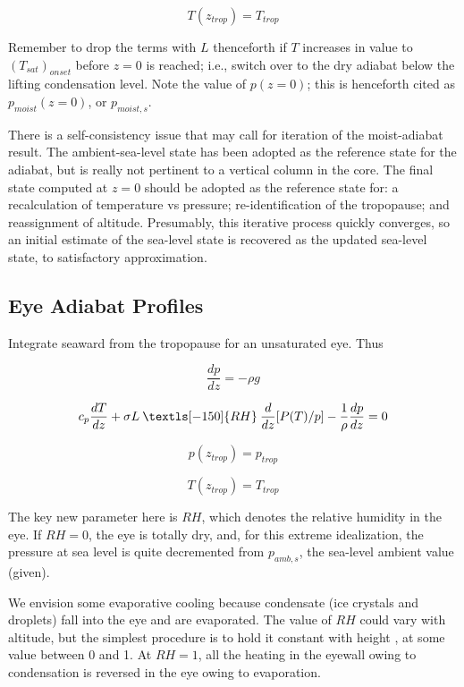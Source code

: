 \documentclass[preprint, prX]{revtex4}
\newcommand{\dd}[2]{\frac{d#1}{d#2}}
\newcommand{\rh}{\:\textls[-150]{RH}\:}
\newcommand{\ztrop}{z_{trop}}
\begin{document}
\begin{equation}
	T(\ztrop ) = T_{trop}
\end{equation}

Remember to drop the terms with $L$ thenceforth if $T$ increases in value to $(T_{sat})_{onset}$ before $z=0$ is reached; i.e., switch over to the dry adiabat below the lifting condensation level. Note the value of $p(z=0)$; this is henceforth cited as $p_{moist}(z=0)$, or $p_{moist,s}$.

There is a self-consistency issue that may call for iteration of the moist-adiabat result. The ambient-sea-level state has been adopted as the reference state for the adiabat, but is really not pertinent to a vertical column in the core. The final state computed at $z=0$ should be adopted as the reference state for: a recalculation of temperature vs pressure; re-identification of the tropopause; and reassignment of altitude. Presumably, this iterative process quickly converges, so an initial estimate of the sea-level state is recovered as the updated sea-level state, to satisfactory approximation.

\subsection{Eye Adiabat Profiles}

Integrate seaward from the tropopause for an unsaturated eye. Thus

\begin{equation}
	\dd{p}{z} = - \rho g
\end{equation}

\begin{equation}
	c_p \dd{T}{z} + \sigma L \rh \dd{}{z} [ P(T) / p] - \frac{1}{\rho} \dd{p}{z} = 0
\end{equation}

\begin{equation}
	p(\ztrop) = p_{trop} 
\end{equation}

\begin{equation}
	T(\ztrop ) = T_{trop}
\end{equation}

The key new parameter here is $RH$, which denotes the relative humidity in the eye. If $RH=0$, the eye is totally dry, and, for this extreme idealization, the pressure at sea level is quite decremented from $p_{amb,s}$, the sea-level ambient value (given).

We envision some evaporative cooling because condensate (ice crystals and droplets) fall into the eye and are evaporated. The value of $RH$ could vary with altitude, but the simplest procedure is to hold it constant with height , at some value between 0 and 1. At $RH=1$, all the heating in the eyewall owing to condensation is reversed in the eye owing to evaporation.
\end{document}
